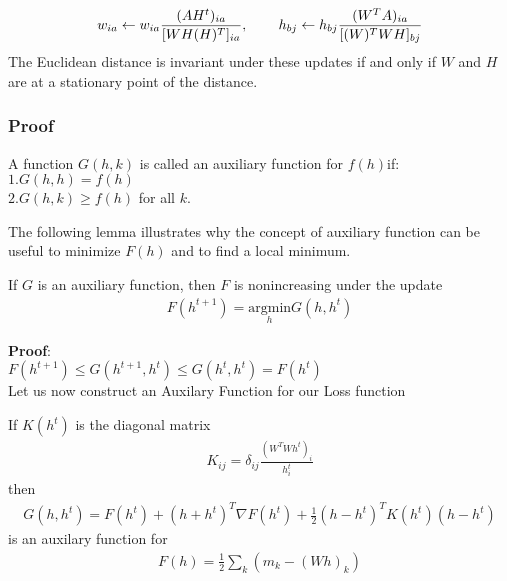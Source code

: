 \documentclass[aspectratio=169]{beamer}
\begin{document}
\begin{spacing}{1.0}
\begin{frame}
\begin{theorem}
\begin{align*}
            w_{ia} \gets w_{ia}\frac{(AH^{t})_{ia}}{[WH(H)^{T}]_{ia}}, \hspace{0.3in}
            h_{bj} \gets h_{bj}\frac{(W^{T}A)_{ia}}{[(W)^{T}WH]_{bj}} 
        \end{align*}
        The Euclidean distance is invariant under these updates if and only if $W$ and $H$ are at
        a stationary point of the distance.
    \end{theorem}
\end{frame}
\begin{frame}
    \frametitle{Proof}
    \begin{definition}
        A function $G(h, k)$ is called an auxiliary function for $f(h) $if:\\
        $1. G(h,h) = f(h)$\\
        $2. G(h,k) \geq f(h)$ for all $k$. 
    \end{definition}
    The following lemma illustrates why the concept of auxiliary function can be useful to
    minimize $F(h)$ and to find a local minimum.
    \begin{lemma}
        If $G$ is an auxiliary function, then $F$ is nonincreasing under the update\\
        \begin{align}
            F(h^{t+1}) = \underset{h}{\mathrm{argmin}}G(h, h^{t})
        \end{align}
    \end{lemma}
\end{frame}
\begin{frame}
    \textbf{Proof}:\\
    $F(h^{t+1}) \leq G(h^{t+1}, h^{t}) \leq G(h^{t}, h^{t}) = F(h^{t})$\\
    Let us now construct an Auxilary Function for our Loss function
    \begin{lemma}
        If $K(h^{t})$ is the diagonal matrix
        \begin{align*}
            K_{ij} = \delta_{ij}\frac{(W^{T}Wh^{t})_{i}}{h_{i}^{t}}
        \end{align*}
        then 
        \begin{align}
            G(h, h^{t}) = F(h^{t}) + (h + h^{t})^{T}\nabla F(h^{t}) + \frac{1}{2}
            (h - h^{t})^{T}K(h^{t})(h - h^{t})
        \end{align}
        is an auxilary function for 
        \begin{align}
            F(h) = \frac{1}{2}\sum_{k}(m_{k} - (Wh)_{k})

\end{align}
\end{lemma}
\end{frame}
\end{spacing}
\end{document}
